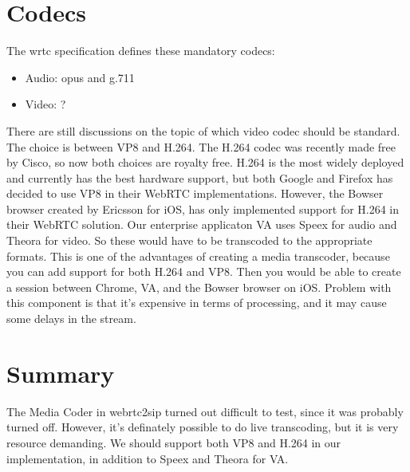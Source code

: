 \section{Codecs}

The \gls{wrtc} specification defines these mandatory codecs:
\begin{itemize}
    \item Audio: opus and g.711
    \item Video: ?
\end{itemize}

There are still discussions on the topic of which video codec should be standard. The choice is between VP8 and H.264. The H.264 codec was recently made free by Cisco\cite{tk}, so now both choices are royalty free. H.264 is the most widely deployed and currently has the best hardware support, but both Google and Firefox has decided to use VP8 in their WebRTC implementations. However, the Bowser browser created by Ericsson for iOS, has only implemented support for H.264 in their WebRTC solution. Our enterprise applicaton VA uses Speex for audio and Theora for video. So these would have to be transcoded to the appropriate formats. This is one of the advantages of creating a media transcoder, because you can add support for both H.264 and VP8. Then you would be able to create a session between Chrome, VA, and the Bowser browser on iOS. Problem with this component is that it's expensive in terms of processing, and it may cause some delays in the stream.

\section{Summary}
The Media Coder in webrtc2sip turned out difficult to test, since it was probably turned off. However, it's definately possible to do live transcoding, but it is very resource demanding. We should support both VP8 and H.264 in our implementation, in addition to Speex and Theora for VA.
